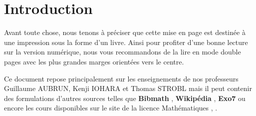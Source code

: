 \part{Introduction}

\def\arraystretch{1.5}
\par Avant toute chose, nous tenons à préciser que cette mise en page est destinée à une impression sous la forme d'un livre. Ainsi pour profiter d'une bonne lecture sur la version numérique, nous vous recommandons de la lire en mode \og double pages \fg avec les plus grandes marges orientées vers le centre. 
\\
\par \noindent Ce document repose principalement sur les enseignements de nos professeurs Guillaume AUBRUN, Kenji IOHARA et Thomas STROBL
mais il peut contenir des formulations d'autres sources telles que \textbf{Bibmath} \cite{bibmath}, \textbf{Wikipédia} \cite{wikipedia}, \textbf{Exo7} \cite{exo7} ou encore les cours disponibles sur le site de la licence Mathématiques \cite{livre_prepa}, \cite{cours_ressayre}.

